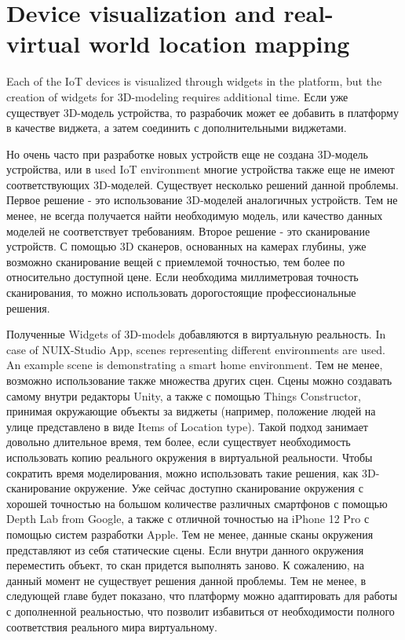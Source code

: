 \section{Device visualization and real-virtual world location mapping}

Each of the IoT devices is visualized through widgets in the platform, but the creation of widgets for 3D-modeling requires additional time. Если уже существует 3D-модель устройства, то разрабочик может ее добавить в платформу в качестве виджета, а затем соединить с дополнительными виджетами.

Но очень часто при разработке новых устройств еще не создана 3D-модель устройства, или в used IoT environment многие устройства также еще не имеют соответствующих 3D-моделей. Существует несколько решений данной проблемы. Первое решение - это использование 3D-моделей аналогичных устройств. Тем не менее, не всегда получается найти необходимую модель, или качество данных моделей не соответствует требованиям. Второе решение - это сканирование устройств. С помощью 3D сканеров, основанных на камерах глубины, уже возможно сканирование вещей с приемлемой точностью, тем более по относительно доступной цене. Если необходима миллиметровая точность сканирования, то можно использовать дорогостоящие профессиональные решения.

Полученные Widgets of 3D-models добавляются в виртуальную реальность. In case of NUIX-Studio App, scenes representing different environments are used. An example scene is demonstrating a smart home environment. Тем не менее, возможно использование также множества других сцен. Сцены можно создавать самому внутри редакторы Unity, а также с помощью Things Constructor, принимая окружающие объекты за виджеты (например, положение людей на улице представлено в виде Items of Location type). Такой подход занимает довольно длительное время, тем более, если существует необходимость использовать копию реального окружения в виртуальной реальности. Чтобы сократить время моделирования, можно использовать такие решения, как 3D-сканирование окружение. Уже сейчас доступно сканирование окружения с хорошей точностью на большом количестве различных смартфонов с помощью Depth Lab from Google, а также с отличной точностью на iPhone 12 Pro с помощью систем разработки Apple. Тем не менее, данные сканы окружения представляют из себя статические сцены. Если внутри данного окружения переместить объект, то скан придется выполнять заново. К сожалению, на данный момент не существует решения данной проблемы. Тем не менее, в следующей главе будет показано, что платформу можно адаптировать для работы с дополненной реальностью, что позволит избавиться от необходимости полного соответствия реального мира виртуальному.


